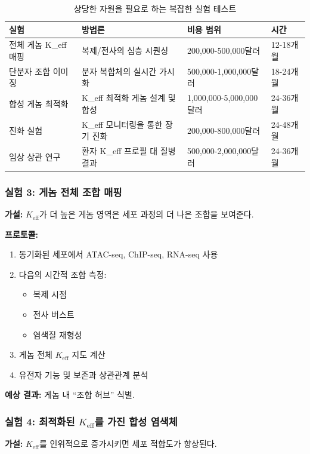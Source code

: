\documentclass[11pt,a4paper]{article}
\begin{document}
	\begin{table}[H]
		\centering
		\caption{상당한 자원을 필요로 하는 복잡한 실험 테스트}
		\begin{tabular}{p{4cm}p{5cm}p{3cm}p{2cm}}
			\toprule
			\textbf{실험} & \textbf{방법론} & \textbf{비용 범위} & \textbf{시간} \\
			\midrule
			전체 게놈 K\_eff 매핑 & 복제/전사의 심층 시퀀싱 & 200,000-500,000달러 & 12-18개월 \\
			단분자 조합 이미징 & 분자 복합체의 실시간 가시화 & 500,000-1,000,000달러 & 18-24개월 \\
			합성 게놈 최적화 & K\_eff 최적화 게놈 설계 및 합성 & 1,000,000-5,000,000달러 & 24-36개월 \\
			진화 실험 & K\_eff 모니터링을 통한 장기 진화 & 200,000-800,000달러 & 24-48개월 \\
			임상 상관 연구 & 환자 K\_eff 프로필 대 질병 결과 & 500,000-2,000,000달러 & 24-36개월 \\
			\bottomrule
		\end{tabular}
	\end{table}
	
	\subsubsection{실험 3: 게놈 전체 조합 매핑}
	\textbf{가설:} $K_{\text{eff}}$가 더 높은 게놈 영역은 세포 과정의 더 나은 조합을 보여준다.
	
	\textbf{프로토콜:}
	\begin{enumerate}
		\item 동기화된 세포에서 ATAC-seq, ChIP-seq, RNA-seq 사용
		\item 다음의 시간적 조합 측정:
		\begin{itemize}
			\item 복제 시점
			\item 전사 버스트
			\item 염색질 재형성
		\end{itemize}
		\item 게놈 전체 $K_{\text{eff}}$ 지도 계산
		\item 유전자 기능 및 보존과 상관관계 분석
	\end{enumerate}
	
	\textbf{예상 결과:} 게놈 내 ``조합 허브'' 식별.
	
	\subsubsection{실험 4: 최적화된 $K_{\text{eff}}$를 가진 합성 염색체}
	\textbf{가설:} $K_{\text{eff}}$를 인위적으로 증가시키면 세포 적합도가 향상된다.
	
\end{document}
